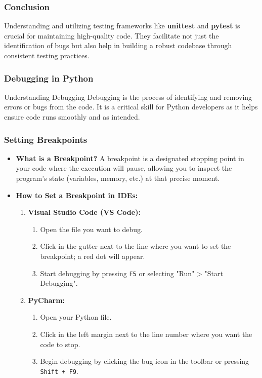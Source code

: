 \documentclass{beamer}
\begin{document}
\begin{frame}
    \frametitle{Conclusion}
    Understanding and utilizing testing frameworks like \textbf{unittest} and \textbf{pytest} is crucial for maintaining high-quality code. They facilitate not just the identification of bugs but also help in building a robust codebase through consistent testing practices.
\end{frame}

\begin{frame}[fragile]
    \frametitle{Debugging in Python}
    \begin{block}{Understanding Debugging}
        Debugging is the process of identifying and removing errors or bugs from the code.
        It is a critical skill for Python developers as it helps ensure code runs smoothly and as intended.
    \end{block}
\end{frame}

\begin{frame}[fragile]
    \frametitle{Setting Breakpoints}
    \begin{itemize}
        \item \textbf{What is a Breakpoint?}  
        A breakpoint is a designated stopping point in your code where the execution will pause, allowing 
        you to inspect the program's state (variables, memory, etc.) at that precise moment.
        
        \item \textbf{How to Set a Breakpoint in IDEs:}
        \begin{enumerate}
            \item \textbf{Visual Studio Code (VS Code):}
            \begin{enumerate}
                \item Open the file you want to debug.
                \item Click in the gutter next to the line where you want to set the breakpoint; a red dot will appear.
                \item Start debugging by pressing \texttt{F5} or selecting "Run" > "Start Debugging".
            \end{enumerate}
            \item \textbf{PyCharm:}
            \begin{enumerate}
                \item Open your Python file.
                \item Click in the left margin next to the line number where you want the code to stop.
                \item Begin debugging by clicking the bug icon in the toolbar or pressing \texttt{Shift + F9}.
            \end{enumerate}
        \end{enumerate}
    \end{itemize}
\end{frame}
\end{document}
